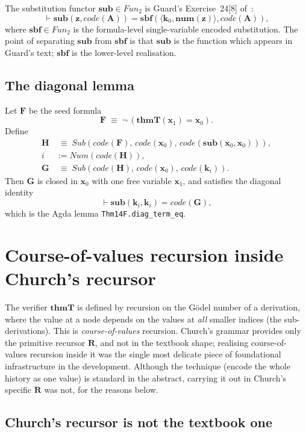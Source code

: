 \documentclass[11pt]{article}
\theoremstyle{plain}
\theoremstyle{definition}
\theoremstyle{remark}
\newcommand{\code}[1]{\mathit{code}(#1)}
\newcommand{\sub}{\mathbf{sub}}
\newcommand{\sbf}{\mathbf{sbf}}
\newcommand{\thmT}{\mathbf{thmT}}
\newcommand{\num}{\mathbf{num}}
\newcommand{\seq}[1]{\langle #1 \rangle}
\newcommand{\Fun}{\mathit{Fun}}
\newcommand{\Sub}{\mathit{Sub}}
\newcommand{\Num}{\mathit{Num}}
\begin{document}
The substitution functor $\sub \in \Fun_2$ is Guard's Exercise~24[8]
of~\cite{Guard1963}:
\[
\vdash \sub(\mathbf{z}, \code{\mathbf{A}}) = \sbf(\seq{\mathbf{k}_0, \num(\mathbf{z})}, \code{\mathbf{A}}),
\]
where $\sbf \in \Fun_2$ is the formula-level single-variable encoded
substitution.  The point of separating $\sub$ from $\sbf$ is that
$\sub$ is the function which appears in Guard's text; $\sbf$ is the
lower-level realisation.

\subsection{The diagonal lemma}

Let $\mathbf{F}$ be the seed formula
\[
\mathbf{F} \;\equiv\; \neg\,(\thmT(\mathbf{x}_1) = \mathbf{x}_0).
\]
Define
\begin{align*}
\mathbf{H} &\;\equiv\; \Sub(\code{\mathbf{F}},\, \code{\mathbf{x}_0},\, \code{\sub(\mathbf{x}_0, \mathbf{x}_0)}), \\
i &:= \Num(\code{\mathbf{H}}), \\
\mathbf{G} &\;\equiv\; \Sub(\code{\mathbf{H}},\, \code{\mathbf{x}_0},\, \code{\mathbf{k}_i}).
\end{align*}
Then $\mathbf{G}$ is closed in $\mathbf{x}_0$ with one free variable
$\mathbf{x}_1$, and satisfies the diagonal identity
\[
\vdash \sub(\mathbf{k}_i, \mathbf{k}_i) = \code{\mathbf{G}},
\]
which is the Agda lemma \texttt{Thm14F.diag\_term\_eq}.

\section{Course-of-values recursion inside Church's recursor}
\label{sec:cov}

The verifier $\thmT$ is defined by recursion on the G\"odel number of a
derivation, where the value at a node depends on the values at
\emph{all} smaller indices (the sub-derivations).  This is
\emph{course-of-values} recursion.  Church's grammar provides only the
primitive recursor $\mathbf{R}$, and not in the textbook shape; realising
course-of-values recursion inside it was the single most delicate piece
of foundational infrastructure in the development.  Although the
technique (encode the whole history as one value) is standard in the
abstract, carrying it out in Church's specific $\mathbf{R}$ was not, for
the reasons below.

\subsection{Church's recursor is not the textbook one}
\end{document}
